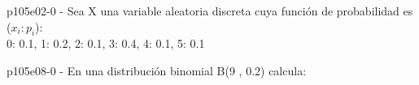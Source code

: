 \documentclass[spanish, 11pt]{exam}
\begin{document}
        \begin{questions}
        \question p105e02-0 - Sea X una variable aleatoria discreta cuya función de probabilidad es ($x_i:p_i$):\\{0: 0.1, 1: 0.2, 2: 0.1, 3: 0.4, 4: 0.1, 5: 0.1} 
    
        \begin{multicols}{1}
        \end{multicols}
        \question p105e08-0 - En una distribución binomial B(9 , 0.2) calcula:\\ 
    

\end{questions}
\end{document}

